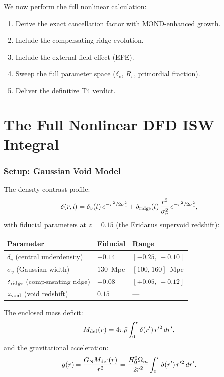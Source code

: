 \documentclass[11pt,a4paper]{article}
\newcommand{\Hzero}{H_0}
\newcommand{\GN}{G_{\rm N}}
\newcommand{\Omm}{\Omega_m}
\begin{document}
We now perform the full nonlinear calculation:
\begin{enumerate}[nosep]
\item Derive the exact cancellation factor with MOND-enhanced growth.
\item Include the compensating ridge evolution.
\item Include the external field effect (EFE).
\item Sweep the full parameter space ($\delta_v$, $R_v$, primordial fraction).
\item Deliver the definitive T4 verdict.
\end{enumerate}


\part{The Full Nonlinear DFD ISW Integral}
\label{part:derivation}

\section{Setup: Gaussian Void Model}
\label{sec:void-model}

The density contrast profile:
\begin{equation}
\delta(r,t) = \delta_v(t)\,e^{-r^2/2\sigma_v^2}
+ \delta_{\rm ridge}(t)\,\frac{r^2}{\sigma_v^2}\,e^{-r^2/2\sigma_v^2},
\label{eq:void-profile}
\end{equation}
with fiducial parameters at $z = 0.15$ (the Eridanus supervoid redshift):
\begin{center}
\begin{tabular}{lll}
\toprule
\textbf{Parameter} & \textbf{Fiducial} & \textbf{Range} \\
\midrule
$\delta_v$ (central underdensity) & $-0.14$ & $[-0.25,\,-0.10]$ \\
$\sigma_v$ (Gaussian width) & $130$~Mpc & $[100,\,160]$~Mpc \\
$\delta_{\rm ridge}$ (compensating ridge) & $+0.08$ & $[+0.05,\,+0.12]$ \\
$z_{\rm void}$ (void redshift) & $0.15$ & --- \\
\bottomrule
\end{tabular}
\end{center}

The enclosed mass deficit:
\begin{equation}
M_{\rm def}(r) = 4\pi\bar{\rho}\int_0^r \delta(r')\,r'^2\,dr',
\end{equation}
and the gravitational acceleration:
\begin{equation}
g(r) = \frac{\GN M_{\rm def}(r)}{r^2}
= \frac{\Hzero^2\Omm}{2r^2}\int_0^r \delta(r')\,r'^2\,dr'.
\label{eq:g-profile}
\end{equation}
\end{document}
